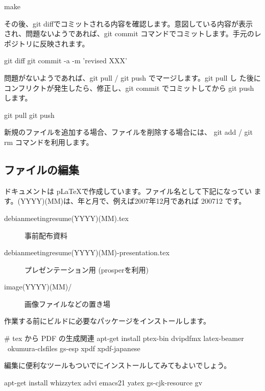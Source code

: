 \documentclass[mingoth,a4paper]{jsarticle}
\begin{document}
\begin{commandline}
 make
\end{commandline}

その後、git diffでコミットされる内容を確認します。意図している内容が表示
され、問題ないようであれば、git commit コマンドでコミットします。手元のレ
ポジトリに反映されます。

\begin{commandline}
 git diff
 git commit -a -m 'revised XXX'
\end{commandline}

問題がないようであれば、git pull / git push でマージします。git pull し
た後にコンフリクトが発生したら、修正し、git commit でコミットしてから
git push します。

\begin{commandline}
 git pull 
 git push 
\end{commandline}

新規のファイルを追加する場合、ファイルを削除する場合には、 git add /
git rm コマンドを利用します。

\subsection{ファイルの編集}

ドキュメントは p\LaTeX{}で作成しています。ファイル名として下記になってい
ます。(YYYY)(MM)は、年と月で、例えば2007年12月であれば 200712 です。

\begin{description}
 \item[debianmeetingresume(YYYY)(MM).tex]
	    事前配布資料
 \item[debianmeetingresume(YYYY)(MM)-presentation.tex]
	    プレゼンテーション用 (prosperを利用)
 \item[image(YYYY)(MM)/]
	    画像ファイルなどの置き場
\end{description}


作業する前にビルドに必要なパッケージをインストールします。

\begin{commandline}
# tex から PDF の生成関連
apt-get install ptex-bin dvipdfmx latex-beamer \
 okumura-clsfiles gs-esp xpdf xpdf-japanese
\end{commandline}

編集に便利なツールもついでにインストールしてみてもよいでしょう。

\begin{commandline}
 apt-get install whizzytex advi emacs21 yatex gs-cjk-resource gv
\end{commandline}
\end{document}

